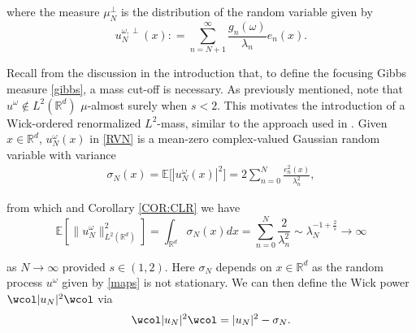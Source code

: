 \documentclass[%
11pt,  reqno]{amsart}
\theoremstyle{remarkstyle}
\newcommand{\1}{\hspace{0.2mm}\text{I}\hspace{0.2mm}}
\newcommand{\noi}{\noindent}
\newcommand{\R}{\mathbb{R}}
\let\P= \undefined
\newcommand{\P}{\mathbf{P}}
\newcommand{\E}{\mathbb{E}}
\newcommand{\ld}{\lambda}
\newcommand{\s}{\sigma}
\newcommand{\wick}[1]{\wcol#1\wcol}
\renewcommand{\o}{\omega}
\numberwithin{equation}{section}
\numberwithin{theorem}{section}
\begin{document}
	\noi
	where the measure $\mu_N^\perp$ is the distribution of the 
	random variable given by 
	\[
	u_N^{\o,\perp} (x):  = \sum_{n = N+1}^\infty \frac{g_n (\o)}{\ld_n} e_n (x).
	\]
	
	
	
	
	Recall from the discussion in the introduction that, to define the focusing Gibbs measure \eqref{gibbs}, a mass cut-off is necessary.
	As previously mentioned, note that $u^\o \notin L^2(\mathbb{R}^d)$ $\mu$-almost surely when $s < 2$. This motivates the introduction of a Wick-ordered renormalized $L^2$-mass, similar to the approach used in \cite{BO99,BTTz13,OST22,RSTW22}.
	Given $x \in \R^d$, $u_N^\o (x)$ in \eqref{RVN} 
	is a mean-zero complex-valued Gaussian random variable with variance
	\begin{align}
		\label{variance}
		\s_N (x) = \E \big[ |u_N^\o (x)|^2 \big] = 2\sum_{n=0}^N \frac{e^2_n(x)}{\ld_n^2} ,
	\end{align}
	
	\noi
	from which and Corollary \ref{COR:CLR} we have 
	\[
	\E\left[\|u_N^\o\|_{L^2(\R^d)}^2\right]=\int_{\R^d} \s_N (x) dx = \sum_{n =0}^N \frac{2}{\ld_n^2}  \sim \ld_N^{-1 + \frac2s} \to \infty 
	\]
	
	\noi
	as $N \to \infty$ provided $s\in (1,2)$. Here $\s_N$ depends on $x\in \R^d$ as the random process $u^\o$ given by \eqref{maps} is not stationary.
	We can then define the Wick power $\wick{|u_N|^2}$ via
	\begin{align}
		\wick{|u_N|^2} =  |u_N|^2 - \s_N.
		\label{Wick}
	\end{align}
	
\end{document}
